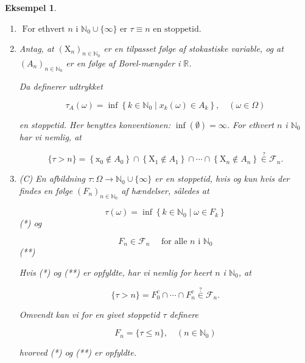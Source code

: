 \documentclass{article}
\newcommand{\1}{\mathbbm{1}}
\theoremstyle{boxed}
\newtheorem{example}[theorem]{Eksempel}
\begin{document}
\begin{example}
    \begin{enumerate}
        \item $\text { For ethvert } n \text { i } \mathbb{N}_0 \cup\{\infty\} \text { er } \tau \equiv n \text { en stoppetid. }$
        \item Antag, at $\left(\mathrm{X}_n\right)_{n \in \mathbb{N}_0}$ er en tilpasset følge af stokastiske variable, og at $\left(A_n\right)_{n \in \mathbb{N}_0}$ er en følge af Borel-mængder i $\mathbb{R}$.

        Da definerer udtrykket
        
        $$
        \tau_A(\omega)=\inf \left\{k \in \mathbb{N}_0 \mid x_k(\omega) \in A_k\right\}, \quad(\omega \in \Omega)
        $$
        
        en stoppetid.
        Her benyttes konventionen: $\inf (\emptyset)=\infty$.
        For ethvert $n$ i $\mathbb{N}_0$ har vi nemlig, at
        
        $$
        \{\tau>n\}=\left\{\mathrm{x}_0 \notin A_0\right\} \cap\left\{\mathrm{X}_1 \notin A_1\right\} \cap \cdots \cap\left\{\mathrm{X}_n \notin A_n\right\} \stackrel{?}{\in} \mathcal{F}_n .
        $$
        \item (C) En afbildning $\tau: \Omega \rightarrow \mathbb{N}_0 \cup\{\infty\}$ er en stoppetid, hvis og kun hvis der findes en følge $\left(F_n\right)_{n \in \mathbb{N}_0}$ af hændelser, således at

        $$
        \tau(\omega)=\inf \left\{k \in \mathbb{N}_0 \mid \omega \in F_k\right\}
        $$
        (*)
        og
        
        $$
        F_n \in \mathcal{F}_n \quad \text { for alle } n \text { i } \mathbb{N}_0
        $$
        (**)
        
        Hvis (*) og (**) er opfyldte, har vi nemlig for heert $n$ i $\mathbb{N}_0$, at
        
        $$
        \{\tau>n\}=F_0^c \cap \cdots \cap F_n^c \stackrel{?}{\in} \mathcal{F}_n .
        $$
        
        
        Omvendt kan vi for en givet stoppetid $\tau$ definere
        
        $$
        F_n=\{\tau \leq n\}, \quad\left(n \in \mathbb{N}_0\right)
        $$
        
        hvorved (*) og (**) er opfyldte.
    \end{enumerate}
\end{example}
\end{document}
